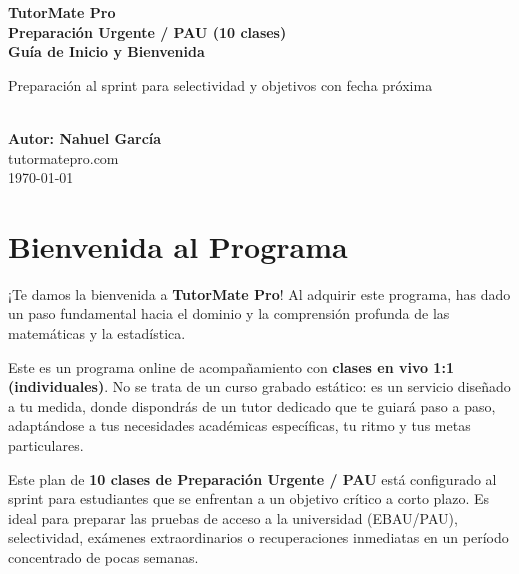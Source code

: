 \documentclass[11pt,a4paper]{article}
\begin{document}
\begin{titlepage}
    \centering
    \vspace*{2cm}
    {\Huge \color{primary} \textbf{TutorMate Pro}} \\[0.5cm]
    {\huge \color{accent} \textbf{Preparación Urgente / PAU (10 clases)}} \\[0.8cm]
    {\Large \color{gold} \textbf{Guía de Inicio y Bienvenida}} \\[1.5cm]
    
    \begin{minipage}{0.8\textwidth}
        \centering
        \large \color{primary} Preparación al sprint para selectividad y objetivos con fecha próxima
    \end{minipage} \\[2cm]
    
    \vspace*{\fill}
    {\large \color{primary} \textbf{Autor: Nahuel García}} \\
    {\large \color{primary} tutormatepro.com} \\
    {\small \color{accent} \today}
\end{titlepage}

\newpage
\tableofcontents
\newpage

\section{Bienvenida al Programa}
¡Te damos la bienvenida a \textbf{TutorMate Pro}! Al adquirir este programa, has dado un paso fundamental hacia el dominio y la comprensión profunda de las matemáticas y la estadística. 

Este es un programa online de acompañamiento con \textbf{clases en vivo 1:1 (individuales)}. No se trata de un curso grabado estático: es un servicio diseñado a tu medida, donde dispondrás de un tutor dedicado que te guiará paso a paso, adaptándose a tus necesidades académicas específicas, tu ritmo y tus metas particulares.

Este plan de \textbf{10 clases de Preparación Urgente / PAU} está configurado al sprint para estudiantes que se enfrentan a un objetivo crítico a corto plazo. Es ideal para preparar las pruebas de acceso a la universidad (EBAU/PAU), selectividad, exámenes extraordinarios o recuperaciones inmediatas en un período concentrado de pocas semanas.
\end{document}
